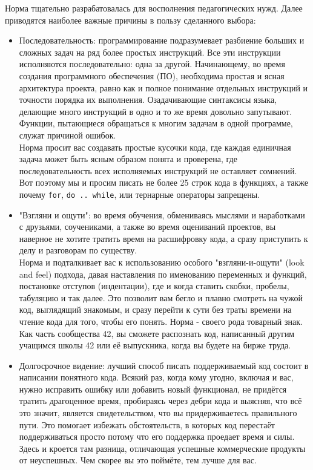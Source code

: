 \documentclass{42-ru}
\begin{document}
    Норма тщательно разрабатовалась для восполнения педагогических нужд.
    Далее приводятся наиболее важные причины в пользу сделанного выбора:
    \begin{itemize}

        \item Последовательность: программирование подразумевает разбиение больших и сложных задач
            на ряд более простых инструкций. Все эти инструкции исполняются последовательно:
            одна за другой. Начинающему, во время создания программного обеспечения (ПО), необходима
            простая и ясная архитектура проекта, равно как и полное понимание отдельных инструкций и
            точности порядка их выполнения. Озадачивающие синтаксисы языка, делающие много инструкций
            в одно и то же время довольно запутывают. Функции, пытающиеся обращаться к многим задачам в одной программе, служат причиной ошибок.\\
            Норма просит вас создавать простые кусочки кода, где каждая единичная задача может быть
            ясным образом понята и проверена, где последовательность всех исполняемых инструкций
            не оставляет сомнений. Вот поэтому мы и просим писать не более 25 строк кода в функциях,
            а также почему \texttt{for}, \texttt{do .. while}, или тернарные операторы запрещены.

        \item "Взгляни и ощути": во время обучения, обмениваясь мыслями и наработками с друзьями,
            соучениками, а также во время оцениваний проектов, вы наверное не хотите тратить время
            на расшифровку кода, а сразу приступить к делу и разговорам по существу.\\
            Норма и подталкивает вас к использованию особого "взгляни-и-ощути" (look and feel) подхода,
            давая наставления по именованию переменных и функций, постановке отступов (индентации),
            где и когда ставить скобки, пробелы, табуляцию и так далее.
            Это позволит вам бегло и плавно смотреть на чужой код, выглядящий знакомым, и сразу перейти
            к сути без траты времени на чтение кода для того, чтобы его понять.
            Норма - своего рода товарный знак. Как часть сообщества 42, вы сможете распознать код,
            написанный другим учащимся школы 42 или её выпускника, когда вы будете на бирже труда.
    
        \item Долгосрочное видение: лучший способ писать поддерживаемый код состоит в написании понятного кода.
            Всякий раз, когда кому угодно, включая и вас, нужно исправить ошибку или добавить новый функционал,
            не придётся тратить драгоценное время, пробираясь через дебри кода и выясняя, что всё это значит,
            является свидетельством, что вы придерживаетесь правильного пути. Это помогает избежать обстоятельств,
            в которых код перестаёт поддерживаться просто потому что его поддержка проедает время и силы.
            Здесь и кроется там разница, отличающая успешные коммерческие продукты от неуспешных.
            Чем скорее вы это поймёте, тем лучше для вас.


\end{itemize}
\end{document}
